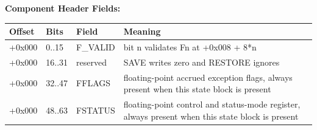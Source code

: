 \documentclass[10pt,twoside]{article}
\renewcommand{\arraystretch}{1.12}
\begin{document}
\Needspace{1.51in}
\noindent\textbf{Component Header Fields:}\par\smallskip\noindent
\begingroup\footnotesize\renewcommand{\arraystretch}{1.08}
\begin{tabularx}{0.985\linewidth}{|p{0.56in}|p{0.62in}|p{1.35in}|X|}
\hline
\textbf{Offset} & \textbf{Bits} & \textbf{Field} & \textbf{Meaning}\\
\hline
+0x000 & 0..15 & F\_VALID & bit n validates Fn at +0x008 + 8*n\\
\hline
+0x000 & 16..31 & reserved & SAVE writes zero and RESTORE ignores\\
\hline
+0x000 & 32..47 & FFLAGS & floating-point accrued exception flags, always present when this state block is present\\
\hline
+0x000 & 48..63 & FSTATUS & floating-point control and status-mode register, always present when this state block is present\\
\hline
\end{tabularx}\endgroup\par\smallskip
\smallskip
\end{document}
